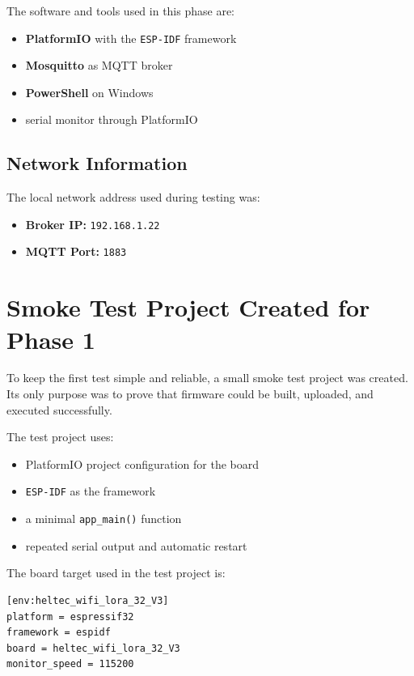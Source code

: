 \documentclass[12pt,a4paper]{article}
\begin{document}
The software and tools used in this phase are:

\begin{itemize}
    \item \textbf{PlatformIO} with the \texttt{ESP-IDF} framework
    \item \textbf{Mosquitto} as MQTT broker
    \item \textbf{PowerShell} on Windows
    \item serial monitor through PlatformIO
\end{itemize}

\subsection{Network Information}

The local network address used during testing was:

\begin{itemize}
    \item \textbf{Broker IP:} \texttt{192.168.1.22}
    \item \textbf{MQTT Port:} \texttt{1883}
\end{itemize}

\section{Smoke Test Project Created for Phase 1}

To keep the first test simple and reliable, a small smoke test project was
created. Its only purpose was to prove that firmware could be built, uploaded,
and executed successfully.

The test project uses:

\begin{itemize}
    \item PlatformIO project configuration for the board
    \item \texttt{ESP-IDF} as the framework
    \item a minimal \texttt{app\_main()} function
    \item repeated serial output and automatic restart
\end{itemize}

The board target used in the test project is:

\begin{lstlisting}
[env:heltec_wifi_lora_32_V3]
platform = espressif32
framework = espidf
board = heltec_wifi_lora_32_V3
monitor_speed = 115200
\end{lstlisting}
\end{document}

